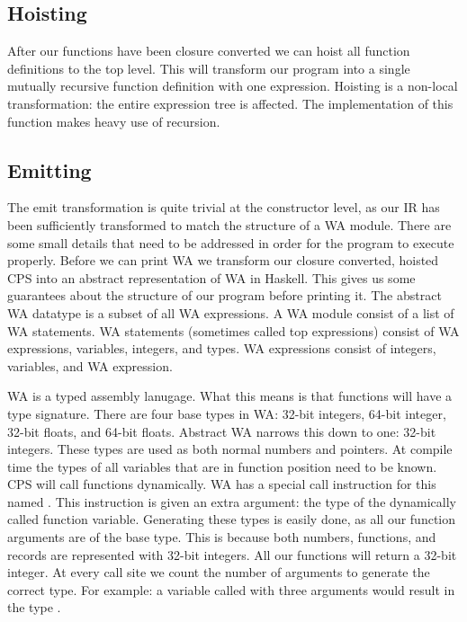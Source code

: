 \subsection{\label{section:hoist}Hoisting}
After our functions have been closure converted we can hoist all function definitions to the top level. This will transform our program into a single mutually recursive function definition with one expression. Hoisting is a non-local transformation: the entire expression tree is affected. The implementation of this function makes heavy use of recursion.

\subsection{\label{section:hoist}Emitting}
The emit transformation is quite trivial at the constructor level, as our \ac{IR} has been sufficiently transformed to match the structure of a \ac{WA} module. There are some small details that need to be addressed in order for the program to execute properly. Before we can print \ac{WA} we transform our closure converted, hoisted \ac{CPS} into an abstract representation of \ac{WA} in Haskell. This gives us some guarantees about the structure of our program before printing it. The abstract \ac{WA} datatype is a subset of all \ac{WA} expressions. A \ac{WA} module consist of a list of \ac{WA} statements. \ac{WA} statements (sometimes called top expressions) consist of \ac{WA} expressions, variables, integers, and types. \ac{WA} expressions consist of integers, variables, and \ac{WA} expression.

\ac{WA} is a typed assembly lanugage. What this means is that functions will have a type signature. There are four base types in \ac{WA}: 32-bit integers, 64-bit integer, 32-bit floats, and 64-bit floats. Abstract \ac{WA} narrows this down to one: 32-bit integers. These types are used as both normal numbers and pointers. At compile time the types of all variables that are in function position need to be known. \ac{CPS} will call functions dynamically. \ac{WA} has a special call instruction for this named . This instruction is given an extra argument: the type of the dynamically called function variable. Generating these types is easily done, as all our function arguments are of the base type. This is because both numbers, functions, and records are represented with 32-bit integers. All our functions will return a 32-bit integer. At every call site we count the number of arguments to generate the correct type. For example: a variable  called with three arguments would result in the type .

